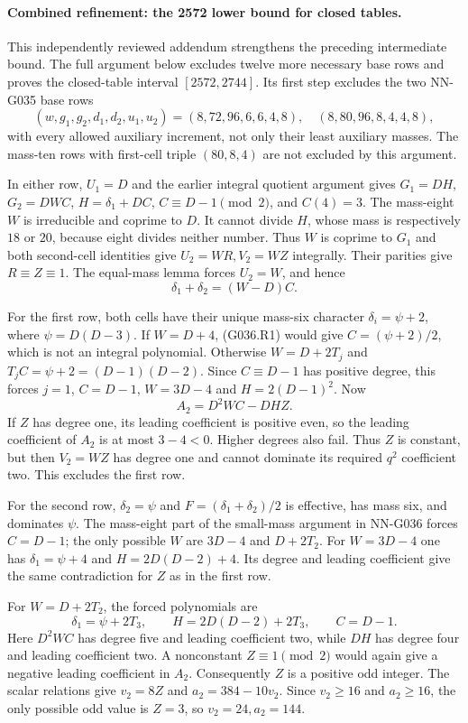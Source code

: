 \paragraph{Combined refinement: the 2572 lower bound for closed tables.}
This independently reviewed addendum strengthens the
preceding intermediate bound. The full argument below
excludes twelve more necessary base rows and proves the
closed-table interval $[2572,2744]$.
Its first step excludes the two
NN-G035 base rows
\[
 (w,g_1,g_2,d_1,d_2,u_1,u_2)
   =(8,72,96,6,6,4,8),\quad(8,80,96,8,4,4,8),
\]
with every allowed auxiliary increment, not only their
least auxiliary masses. The mass-ten rows with first-cell
triple $(80,8,4)$ are not excluded by this argument.

In either row, $U_1=D$ and the earlier integral quotient
argument gives $G_1=DH$, $G_2=DWC$,
$H=\delta_1+DC$, $C\equiv D-1\pmod2$, and $C(4)=3$.
The mass-eight $W$ is irreducible and coprime to $D$.
It cannot divide $H$, whose mass is respectively $18$
or $20$, because eight divides neither number.
Thus $W$ is coprime to $G_1$ and both second-cell
identities give $U_2=WR,V_2=WZ$ integrally.
Their parities give $R\equiv Z\equiv1$.
The equal-mass lemma forces $U_2=W$, and hence
\[
             \delta_1+\delta_2=(W-D)C.               \tag{G036.R1}
\]

For the first row, both cells have their unique
mass-six character $\delta_i=\psi+2$, where
$\psi=D(D-3)$. If $W=D+4$, (G036.R1) would give
$C=(\psi+2)/2$, which is not an integral polynomial.
Otherwise $W=D+2T_j$ and
$T_jC=\psi+2=(D-1)(D-2)$.
Since $C\equiv D-1$ has positive degree, this forces
$j=1$, $C=D-1$, $W=3D-4$ and $H=2(D-1)^2$.
Now
\[
                 A_2=D^2WC-DHZ.
\]
If $Z$ has degree one, its leading coefficient is
positive even, so the leading coefficient of $A_2$
is at most $3-4<0$. Higher degrees also fail.
Thus $Z$ is constant, but then $V_2=WZ$ has degree
one and cannot dominate its required $q^2$ coefficient
two. This excludes the first row.

For the second row, $\delta_2=\psi$ and
$F=(\delta_1+\delta_2)/2$ is effective, has mass six,
and dominates $\psi$. The mass-eight part of the
small-mass argument in NN-G036 forces $C=D-1$;
the only possible $W$ are $3D-4$ and $D+2T_2$.
For $W=3D-4$ one has $\delta_1=\psi+4$ and
$H=2D(D-2)+4$. Its degree and leading coefficient
give the same contradiction for $Z$ as in the first row.

For $W=D+2T_2$, the forced polynomials are
\[
 \delta_1=\psi+2T_3,\qquad
 H=2D(D-2)+2T_3,\qquad C=D-1.
\]
Here $D^2WC$ has degree five and leading coefficient
two, while $DH$ has degree four and leading coefficient
two. A nonconstant $Z\equiv1\pmod2$ would again give
a negative leading coefficient in $A_2$.
Consequently $Z$ is a positive odd integer.
The scalar relations give $v_2=8Z$ and
$a_2=384-10v_2$. Since $v_2\ge16$ and $a_2\ge16$,
the only possible odd value is $Z=3$, so
$v_2=24,a_2=144$.

